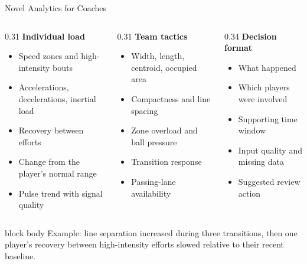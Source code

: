 \documentclass[aspectratio=169,10pt]{beamer}
\begin{document}
\begin{frame}{Novel Analytics for Coaches}
\small
\begin{columns}[T,onlytextwidth]
\begin{column}{0.31\textwidth}
\textbf{Individual load}
\begin{itemize}
  \item Speed zones and high-intensity bouts
  \item Accelerations, decelerations, inertial load
  \item Recovery between efforts
  \item Change from the player's normal range
  \item Pulse trend with signal quality
\end{itemize}
\end{column}
\begin{column}{0.31\textwidth}
\textbf{Team tactics}
\begin{itemize}
  \item Width, length, centroid, occupied area
  \item Compactness and line spacing
  \item Zone overload and ball pressure
  \item Transition response
  \item Passing-lane availability
\end{itemize}
\end{column}
\begin{column}{0.34\textwidth}
\textbf{Decision format}
\begin{itemize}
  \item What happened
  \item Which players were involved
  \item Supporting time window
  \item Input quality and missing data
  \item Suggested review action
\end{itemize}
\end{column}
\end{columns}
\vspace{0.25cm}
\begin{beamercolorbox}[sep=0.2cm]{block body}
\centering Example: line separation increased during three transitions, then one player's recovery between high-intensity efforts slowed relative to their recent baseline.
\end{beamercolorbox}
\end{frame}
\end{document}
